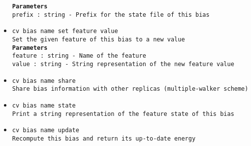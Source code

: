 \begin{itemize}
\texttt{\textbf{Parameters}}
\\
\texttt{prefix : string - Prefix for the state file of this bias}
\item \texttt{cv bias name set feature value}
\\
\texttt{Set the given feature of this bias to a new value}
\\
\texttt{\textbf{Parameters}}
\\
\texttt{feature : string - Name of the feature}
\\
\texttt{value : string - String representation of the new feature value}
\item \texttt{cv bias name share}
\\
\texttt{Share bias information with other replicas (multiple-walker scheme)}
\item \texttt{cv bias name state}
\\
\texttt{Print a string representation of the feature state of this bias}
\item \texttt{cv bias name update}
\\
\texttt{Recompute this bias and return its up-to-date energy}
\end{itemize}
